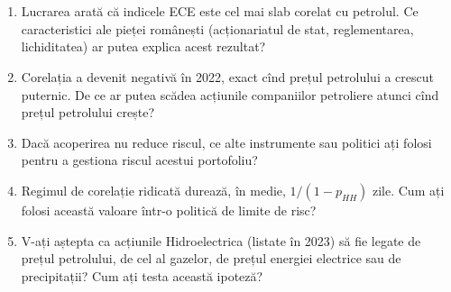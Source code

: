 \section{}
\begin{enumerate}
\item {}%
{Lucrarea arată că indicele ECE este cel mai slab corelat cu petrolul. Ce caracteristici ale pieței românești (acționariatul de stat, reglementarea, lichiditatea) ar putea explica acest rezultat?}
\item {}%
{Corelația a devenit negativă în 2022, exact cînd prețul petrolului a crescut puternic. De ce ar putea scădea acțiunile companiilor petroliere atunci cînd prețul petrolului crește?}
\item {}%
{Dacă acoperirea nu reduce riscul, ce alte instrumente sau politici ați folosi pentru a gestiona riscul acestui portofoliu?}
\item {}%
{Regimul de corelație ridicată durează, în medie, $1/(1-p_{HH})$ zile. Cum ați folosi această valoare într-o politică de limite de risc?}
\item {}%
{V-ați aștepta ca acțiunile Hidroelectrica (listate în 2023) să fie legate de prețul petrolului, de cel al gazelor, de prețul energiei electrice sau de precipitații? Cum ați testa această ipoteză?}
\end{enumerate}

